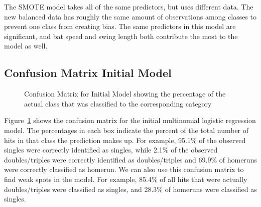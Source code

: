 \documentclass[
  letterpaper,
  DIV=11,
  numbers=noendperiod]{scrartcl}
\begin{document}
The SMOTE model takes all of the same predictors, but uses different
data. The new balanced data has roughly the same amount of observations
among classes to prevent one class from creating bias. The same
predictors in this model are significant, and bat speed and swing length
both contribute the most to the model as well.

\subsection{Confusion Matrix Initial
Model}\label{confusion-matrix-initial-model}

\begin{figure}[H]


\caption{\label{fig-confusion-initial}Confusion Matrix for Initial Model
showing the percentage of the actual class that was classified to the
corresponding category}

\end{figure}%

Figure~\ref{fig-confusion-initial} shows the confusion matrix for the
initial multinomial logistic regression model. The percentages in each
box indicate the percent of the total number of hits in that class the
prediction makes up. For example, 95.1\% of the observed singles were
correctly identified as singles, while 2.1\% of the observed
doubles/triples were correctly identified as doubles/triples and 69.9\%
of homeruns were correctly classified as homerun. We can also use this
confusion matrix to find weak spots in the model. For example, 85.4\% of
all hits that were actually doubles/triples were classified as singles,
and 28.3\% of homeruns were classified as singles.
\end{document}
